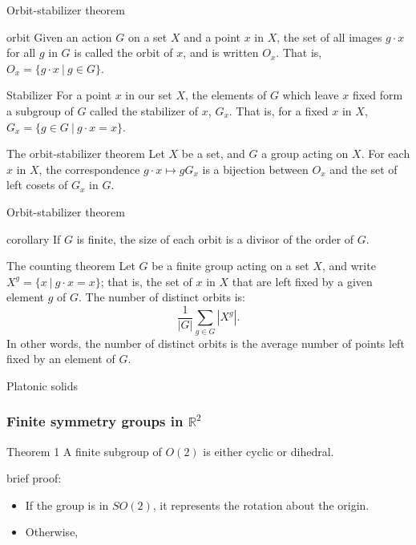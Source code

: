 \documentclass{beamer}
\begin{document}
\begin{frame}{Orbit-stabilizer theorem}
\begin{block}{orbit}
Given an action $G$ on a set $X$ and a point $x$ in $X$, the set of all images $g\cdot x$ for all $g$ in $G$ is called the orbit of $x$, and is written $O_x$. That is, $O_x=\{g\cdot x\ |\ g\in G\}$.
\end{block}
\begin{block}{Stabilizer}
For a point $x$ in our set $X$, the elements of $G$ which leave $x$ fixed form a subgroup of $G$ called the stabilizer of $x$, $G_x$. That is, for a fixed $x$ in $X$, $G_x=\{g\in G\ |\ g\cdot x=x\}$.
\end{block}
\begin{block}{The orbit-stabilizer theorem}
Let $X$ be a set, and $G$ a group acting on $X$. For each $x$ in $X$, the correspondence $g\cdot x\mapsto gG_x$ is a bijection between $O_x$ and the set of left cosets of $G_x$ in $G$.
\end{block}
\end{frame}

\begin{frame}{Orbit-stabilizer theorem}
\begin{block}{corollary}
If $G$ is finite, the size of each orbit is a divisor of the order of $G$.
\end{block}
\begin{block}{The counting theorem}
Let $G$ be a finite group acting on a set $X$, and write $X^g = \{x\ |\ g\cdot x = x\}$; that is, the set of $x$ in $X$ that are left fixed by a given element $g$ of $G$. The number of distinct orbits is:
$$\frac{1}{|G|}\sum_{g\in G}|X^g|.$$
In other words, the number of distinct orbits is the average number of points left fixed by an element of $G$.
\end{block}
\end{frame}


\begin{frame}{Platonic solids}
\end{frame}


\begin{frame}
\frametitle{Finite symmetry groups in $\mathbb{R}^2$}
\begin{block}{Theorem 1}
A finite subgroup of $O(2)$ is either cyclic or dihedral.
\end{block}
\alert{brief proof:} \begin{itemize}
\item<1-> If the group is in $SO(2)$, it represents the rotation about the origin.
\item<2-> Otherwise, 
\end{itemize}
\end{frame}
\end{document}
